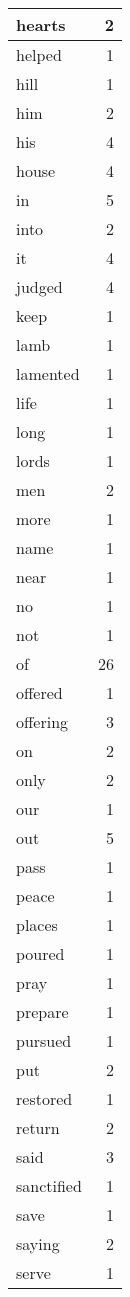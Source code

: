 \begin{center}
\begin{longtable}{l|r}
hearts & 2 \\ \hline
helped & 1 \\ \hline
hill & 1 \\ \hline
him & 2 \\ \hline
his & 4 \\ \hline
house & 4 \\ \hline
in & 5 \\ \hline
into & 2 \\ \hline
it & 4 \\ \hline
judged & 4 \\ \hline
keep & 1 \\ \hline
lamb & 1 \\ \hline
lamented & 1 \\ \hline
life & 1 \\ \hline
long & 1 \\ \hline
lords & 1 \\ \hline
men & 2 \\ \hline
more & 1 \\ \hline
name & 1 \\ \hline
near & 1 \\ \hline
no & 1 \\ \hline
not & 1 \\ \hline
of & 26 \\ \hline
offered & 1 \\ \hline
offering & 3 \\ \hline
on & 2 \\ \hline
only & 2 \\ \hline
our & 1 \\ \hline
out & 5 \\ \hline
pass & 1 \\ \hline
peace & 1 \\ \hline
places & 1 \\ \hline
poured & 1 \\ \hline
pray & 1 \\ \hline
prepare & 1 \\ \hline
pursued & 1 \\ \hline
put & 2 \\ \hline
restored & 1 \\ \hline
return & 2 \\ \hline
said & 3 \\ \hline
sanctified & 1 \\ \hline
save & 1 \\ \hline
saying & 2 \\ \hline
serve & 1 \\ \hline

\end{longtable}
\end{center}
